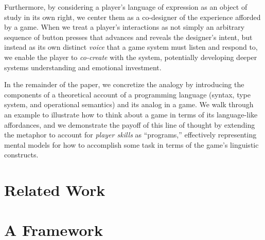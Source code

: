 \documentclass[sigconf]{acmart}
\begin{document}

%
%


Furthermore, by considering a player's language of expression as an object
of study in its own right, we center them as a co-designer of the experience
afforded by a game. When we treat a player's interactions as not simply an
arbitrary sequence of button presses that advances and reveals the
designer's intent, but instead as its own distinct {\em voice} that a game
system must listen and respond to, we enable the player to {\em co-create}
with the system, potentially developing deeper systems understanding
and emotional investment.

In the remainder of the paper, we concretize the analogy by introducing the
components of a theoretical account of a programming language (syntax, type
system, and operational semantics) and its analog in a game. We walk
through an example to illustrate how to think about a game in terms of its
language-like affordances, and we demonstrate the payoff of this line of
thought by extending the metaphor to account for {\em player skills} as
``programs,'' effectively representing mental models for how to accomplish
some task in terms of the game's linguistic constructs.

\section{Related Work}



\section{A Framework}


  
% 
\end{document}

